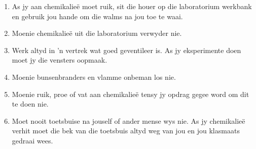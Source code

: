 \begin{enumerate}[noitemsep, label=\textbf{\arabic*}. ]
\item As jy aan chemikalieë moet ruik, sit die houer op die laboratorium werkbank en gebruik jou hande om die walms na jou toe te waai.
\item Moenie chemikalieë uit die laboratorium verwyder nie.
\item Werk altyd in  'n vertrek wat goed geventileer is. As jy eksperimente doen moet jy die vensters oopmaak.
\item Moenie bunsenbranders en vlamme onbeman los nie.
\item Moenie ruik, proe of vat aan chemikalieë tensy jy opdrag gegee word om dit te doen nie.
\item Moet nooit toetsbuise na jouself of ander mense wys nie. As jy chemikalieë verhit moet die bek van die toetsbuis altyd weg van jou en jou klasmaats gedraai wees.
\end{enumerate}
\par 
